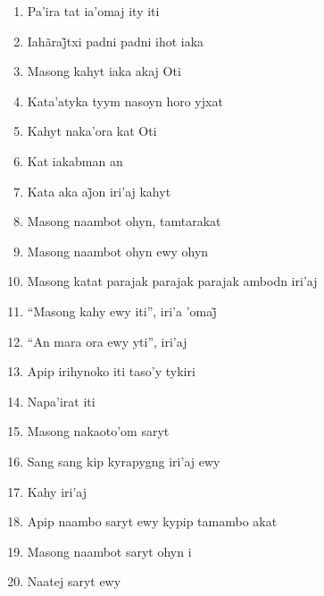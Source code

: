 \begin{enumerate}
 \item Pa'ira tat ia'omaj ity iti

 \item Iahãraj̃txi padni padni ihot iaka

 \item Masong kahyt iaka akaj Oti

 \item Kata'atyka tyym nasoyn horo yjxat

 \item Kahyt naka'ora kat Oti

 \item Kat iakabman an

 \item Kata aka aj̃on iri’aj kahyt

 \begin{center}\end{center}

 \item Masong naambot ohyn, tamtarakat

 \item Masong naambot ohyn ewy ohyn

 \item Masong katat parajak parajak parajak ambodn iri'aj

 \item ``Masong kahy ewy iti'', iri’a ’omaj̃

 \item ``An mara ora ewy yti'', iri'aj

 \item Apip irihynoko iti taso'y tykiri

 \item Napa'irat iti

 \begin{center}\end{center}

 \item Masong nakaoto'om saryt

 \item Sang sang kip kyrapygng iri'aj ewy

 \item Kahy iri'aj

 \item Apip naambo saryt ewy kypip tamambo akat

 \item Masong naambot saryt ohyn i

 \item Naatej saryt ewy


\end{enumerate}
